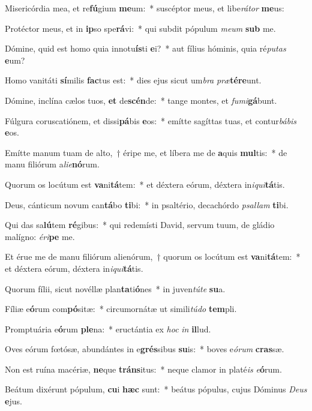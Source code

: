 \item Misericórdia mea, et re\textbf{fú}gium \textbf{me}um:~* suscéptor meus, et libe\textit{rá}\textit{tor} \textbf{me}us:
\item Protéctor meus, et in \textbf{ip}so spe\textbf{rá}vi:~* qui subdit pópulum \textit{me}\textit{um} \textbf{sub} me.
\item Dómine, quid est homo quia innotu\textbf{ís}ti \textbf{e}i?~* aut fílius hóminis, quia ré\textit{pu}\textit{tas} \textbf{e}um?
\item Homo vanitáti \textbf{sí}milis \textbf{fac}tus est:~* dies ejus sicut um\textit{bra} \textit{præ}\textbf{tér}\textbf{e}unt.
\item Dómine, inclína cælos tuos, \textbf{et} de\textbf{scén}de:~* tange montes, et \textit{fu}\textit{mi}\textbf{gá}bunt.
\item Fúlgura coruscatiónem, et dissi\textbf{pá}bis \textbf{e}os:~* emítte sagíttas tuas, et contur\textit{bá}\textit{bis} \textbf{e}os.
\item Emítte manum tuam de alto,~† éripe me, et líbera me de \textbf{a}quis \textbf{mul}tis:~* de manu filiórum a\textit{li}\textit{e}\textbf{nó}rum.
\item Quorum os locútum est \textbf{va}ni\textbf{tá}tem:~* et déxtera eórum, déxtera in\textit{i}\textit{qui}\textbf{tá}tis.
\item Deus, cánticum novum can\textbf{tá}bo \textbf{ti}bi:~* in psaltério, decachórdo \textit{psal}\textit{lam} \textbf{ti}bi.
\item Qui das sa\textbf{lú}tem \textbf{ré}gibus:~* qui redemísti David, servum tuum, de gládio malígno: \textit{é}\textit{ri}\textbf{pe} me.
\item Et érue me de manu filiórum alienórum,~† quorum os locútum est \textbf{va}ni\textbf{tá}tem:~* et déxtera eórum, déxtera in\textit{i}\textit{qui}\textbf{tá}tis.
\item Quorum fílii, sicut novéllæ plan\textbf{ta}ti\textbf{ó}nes~* in juven\textit{tú}\textit{te} \textbf{su}a.
\item Fíliæ e\textbf{ó}rum com\textbf{pó}sitæ:~* circumornátæ ut simili\textit{tú}\textit{do} \textbf{tem}pli.
\item Promptuária e\textbf{ó}rum \textbf{ple}na:~* eructántia ex \textit{hoc} \textit{in} \textbf{il}lud.
\item Oves eórum fœtósæ, abundántes in e\textbf{grés}sibus \textbf{su}is:~* boves e\textit{ó}\textit{rum} \textbf{cras}sæ.
\item Non est ruína macériæ, \textbf{ne}que \textbf{tráns}itus:~* neque clamor in platé\textit{is} \textit{e}\textbf{ó}rum.
\item Beátum dixérunt pópulum, \textbf{cu}i \textbf{hæc} sunt:~* beátus pópulus, cujus Dóminus \textit{De}\textit{us} \textbf{e}jus.
